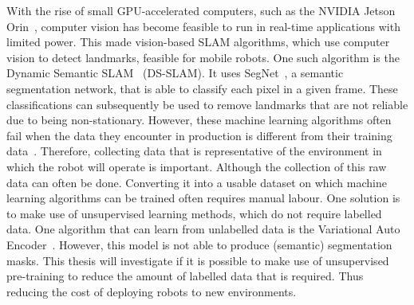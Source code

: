 With the rise of small GPU-accelerated computers, such as the NVIDIA Jetson Orin~\cite{NVIDIA_Karumbunathan_2022}, computer vision has become feasible to run in real-time applications with limited power. This made vision-based SLAM algorithms, which use computer vision to detect landmarks, feasible for mobile robots. One such algorithm is the Dynamic Semantic SLAM~\cite{yu2018ds} (DS-SLAM). It uses SegNet~\cite{badri2017segnet}, a semantic segmentation network, that is able to classify each pixel in a given frame. These classifications can subsequently be used to remove landmarks that are not reliable due to being non-stationary. However, these machine learning algorithms often fail when the data they encounter in production is different from their training data~\cite{Goodfellow-et-al-2016,ozdag2018adversarial,warde201611,10.14778/3632093.3632098,DBLP:journals/corr/KurakinGB16a,10.1145/3422622}. Therefore, collecting data that is representative of the environment in which the robot will operate is important. Although the collection of this raw data can often be done. Converting it into a usable dataset on which machine learning algorithms can be trained often requires manual labour. One solution is to make use of unsupervised learning methods, which do not require labelled data. One algorithm that can learn from unlabelled data is the Variational Auto Encoder~\cite{kingma2014autoencodingvariationalbayes}. However, this model is not able to produce (semantic) segmentation masks. This thesis will investigate if it is possible to make use of unsupervised pre-training to reduce the amount of labelled data that is required. Thus reducing the cost of deploying robots to new environments.

